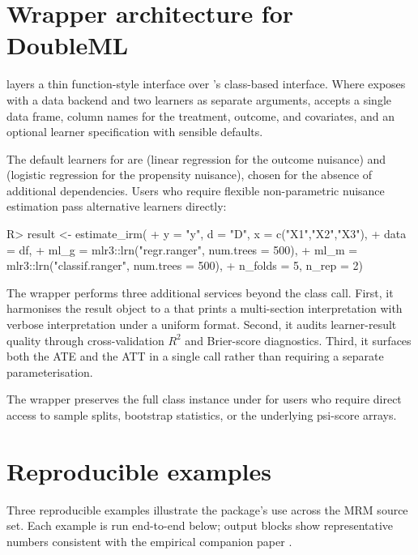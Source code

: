 \documentclass[article,shortnames,nojss]{jss}
\begin{document}
\section{Wrapper architecture for DoubleML}
\label{sec:wrapper}

 layers a thin function-style interface over
's class-based interface. Where 
exposes  with a
data backend and two  learners as separate arguments,
 accepts a single data frame, column
names for the treatment, outcome, and covariates, and an optional
learner specification with sensible defaults.

The default learners for  are
 (linear regression for the outcome nuisance)
and  (logistic regression for the
propensity nuisance), chosen for the absence of additional
dependencies. Users who require flexible non-parametric nuisance
estimation pass alternative  learners directly:

\begin{Code}
R> result <- estimate_irm(
+   y       = "y", d = "D", x = c("X1","X2","X3"),
+   data    = df,
+   ml_g    = mlr3::lrn("regr.ranger", num.trees = 500),
+   ml_m    = mlr3::lrn("classif.ranger", num.trees = 500),
+   n_folds = 5, n_rep = 2)
\end{Code}

\noindent The wrapper performs three additional services beyond
the  class call. First, it harmonises the result
object to a  that prints a multi-section
interpretation with verbose interpretation under a uniform format.
Second, it audits learner-result quality through cross-validation
$R^{2}$ and Brier-score diagnostics. Third, it surfaces both the
ATE and the ATT in a single call rather than requiring a separate
 parameterisation.

The wrapper preserves the full  class instance under
 for users who require direct access to
sample splits, bootstrap statistics, or the underlying psi-score
arrays.

\section{Reproducible examples}
\label{sec:examples}

Three reproducible examples illustrate the package's use across
the MRM source set.  Each example is run end-to-end below; output
blocks show representative numbers consistent with the empirical
companion paper \citep{Ruhela2026MorieEmpirical}.
\end{document}
